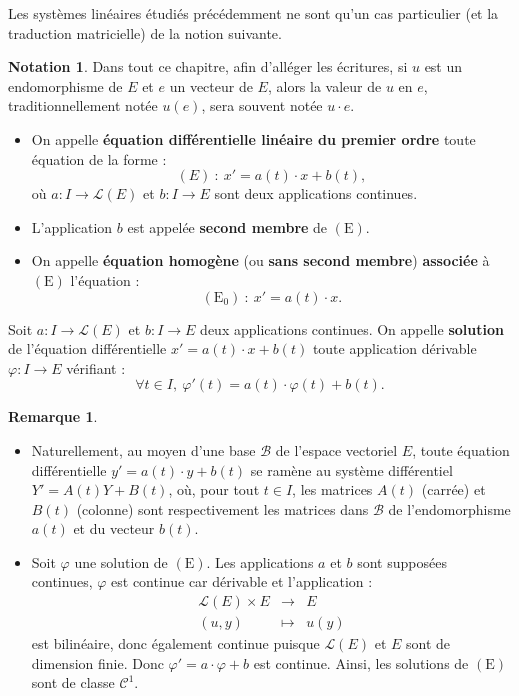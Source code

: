 \documentclass[french]{article}
\theoremstyle{plain}
\theoremstyle{definition}
\newtheorem*{rmq}{Remarque}
\newtheorem*{notation}{Notation}
\theoremstyle{remark}
\begin{document}
Les systèmes linéaires étudiés précédemment ne sont qu'un cas particulier (et la traduction matricielle) de la notion suivante.

\begin{notation}
	Dans tout ce chapitre, afin d'alléger les écritures, si $u$ est un endomorphisme de $E$ et $e$ un vecteur de $E$, alors la valeur de $u$ en $e$, traditionnellement notée $u(e)$, sera souvent notée $u\cdot e$.
\end{notation}

\begin{dfn}
	\begin{itemize}
		\item On appelle \textbf{équation différentielle linéaire du premier ordre} toute équation de la forme :
		$$(E)\ :\ x'=a(t)\cdot x+b(t),$$ où $a:I\to\mathcal{L}(E)$ et $b:I\to E$ sont deux applications continues.
		\item L'application $b$ est appelée \textbf{second membre} de $(\text{E})$.
		\item On appelle \textbf{équation homogène} (ou \textbf{sans second membre}) \textbf{associée} à $(\text{E})$ l'équation :
		$$(\text{E}_0)\ :\ x'=a(t)\cdot x.$$
	\end{itemize}
\end{dfn}

\begin{dfn}
	Soit $a:I\to\mathcal{L}(E)$ et $b:I\to E$ deux applications continues. On appelle \textbf{solution} de l'équation différentielle $x'=a(t)\cdot x+b(t)$ toute application dérivable $\varphi:I\to E$ vérifiant :
	$$\forall t\in I,\ \varphi'(t)=a(t)\cdot\varphi(t)+b(t).$$
\end{dfn}

\begin{rmq}
	\begin{itemize}
		\item Naturellement, au moyen d'une base $\mathcal{B}$ de l'espace vectoriel $E$, toute équation différentielle $y'=a(t)\cdot y+b(t)$ se ramène au système différentiel $Y'=A(t)Y+B(t)$, où, pour tout $t\in I$, les matrices $A(t)$ (carrée) et $B(t)$ (colonne) sont respectivement les matrices dans $\mathcal{B}$ de l'endomorphisme $a(t)$ et du vecteur $b(t)$.
		\item Soit $\varphi$ une solution de $(\text{E})$. Les applications $a$ et $b$ sont supposées continues, $\varphi$ est continue car dérivable et l'application :
		$$\begin{array}{rcl}
			\mathcal{L}(E)\times E&\longrightarrow&E\\
			(u,y)&\longmapsto&u(y)
		\end{array}$$ est bilinéaire, donc également continue puisque $\mathcal{L}(E)$ et $E$ sont de dimension finie. Donc $\varphi'=a\cdot\varphi+b$ est continue. Ainsi, les solutions de $(\text{E})$ sont de classe $\mathcal{C}^1$.
	\end{itemize}
\end{rmq}
\end{document}
